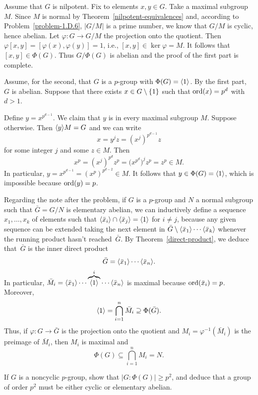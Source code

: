 \begin{solution} Assume that $G$ is nilpotent. Fix to elements $x,y\in G$. Take a maximal subgroup $M$. Since $M$ is normal by Theorem~\ref{nilpotent-equivalences} and, according to Problem~\ref{problem-1.D.6}, $|G/M|$ is a prime number, we know that $G/M$ is cyclic, hence abelian. Let $\varphi\colon G\to G/M$ the projection onto the quotient. Then $\varphi[x,y]=[\varphi(x),\varphi(y)]=1$, i.e., $[x,y]\in\ker\varphi = M$. It follows that $[x,y]\in\Phi(G)$. Thus $G/\Phi(G)$ is abelian and the proof of the first part is complete.

Assume, for the second, that $G$ is a $p$-group with $\Phi(G)=\langle1\rangle$. By the first part,~$G$ is abelian. Suppose that there exists $x\in G\setminus\{1\}$ such that ${\rm ord}(x)=p^d$ with $d>1$.

Define $y=x^{p^{d-1}}$. We claim that $y$ is in every maximal subgroup $M$. Suppose otherwise. Then $\langle y\rangle M=G$ and we can write
$$
    x = y^jz = (x^j)^{p^{d-1}}z
$$
for some integer $j$ and some $z\in M$. Then
$$
    x^p=(x^j)^{p^d}z^p=\big(x^{p^{d}}\big)^jz^p=z^p\in M.
$$
In particular, $y=x^{p^{d-1}}=(x^p)^{p^{d-2}}\in M$. It follows that $y\in\Phi(G)=\langle1\rangle$, which is impossible because ${\rm ord}(y)=p$. 

\bigskip

Regarding the note after the problem, if $G$ is a $p$-group and $N$ a normal subgroup such that $\bar G=G/N$ is elementary abelian, we can inductively define a sequence $x_1,\dots,x_k$ of elements such that $\langle\bar x_i\rangle\cap\langle\bar x_j\rangle=\langle1\rangle$ for $i\ne j$, because any given sequence can be extended taking the next element in $\bar G\setminus\langle\bar x_1\rangle\cdots\langle\bar x_k\rangle$ whenever the running product hasn't reached~$\bar G$. By Theorem~\ref{direct-product}, we deduce that~$\bar G$ is the inner direct product
$$
    \bar G = \langle\bar x_1\rangle\cdots\langle\bar x_n\rangle.
$$
In particular, $\bar M_i=\langle\bar x_1\rangle\cdots\overbrace{\langle1\rangle}^i\cdots\langle\bar x_n\rangle$ is maximal because ${\rm ord}(\bar x_i)=p$. Moreover,
$$
    \langle1\rangle = \bigcap_{i=1}^n\bar M_i \supseteq\Phi(\bar G).
$$
Thus, if $\varphi\colon G\to \bar G$ is the projection onto the quotient and $M_i=\varphi^{-1}(\bar M_i)$ is the preimage of $\bar M_i$, then $M_i$ is maximal and
$$
    \Phi(G)\subseteq\bigcap_{i=1}^nM_i=N.
$$

 \end{solution}

\begin{probl}\label{problem-1.D.9}
    If $G$ is a noncyclic $p$-group, show that $|G:\Phi(G)|\ge p^2$, and deduce that a group of order $p^2$ must be either cyclic or elementary abelian.
\end{probl}

